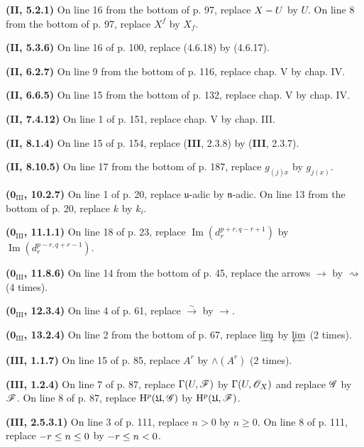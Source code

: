 \noindent\textbf{(\textbf{II}, 5.2.1)} On line 16 from the bottom of p. 97, replace
$X- U$ by $U$. On line 8 from the bottom of p. 97, replace $X^f$ by $X_f$.

\noindent\textbf{(\textbf{II}, 5.3.6)} On line 16 of p. 100, replace (4.6.18) by
(4.6.17).

\noindent\textbf{(\textbf{II}, 6.2.7)} On line 9 from the bottom of p. 116, replace
chap. V by chap. IV.

\noindent\textbf{(\textbf{II}, 6.6.5)} On line 15 from the bottom of p. 132, replace
chap. V by chap. IV.

\noindent\textbf{(\textbf{II}, 7.4.12)} On line 1 of p. 151, replace chap. V by chap.
III.

\noindent\textbf{(\textbf{II}, 8.1.4)} On line 15 of p. 154, replace (\textbf{III}, 2.3.8) by
(\textbf{III}, 2.3.7).

\noindent\textbf{(\textbf{II}, 8.10.5)} On line 17 from the bottom of p. 187, replace
$g_{(j)x}$ by $g_{j(x)}$.

\noindent\textbf{($\mathbf{0}_{\mathrm{III}}$, 10.2.7)} On line 1 of p. 20, replace
$\mathfrak u$-adic by $\mathfrak n$-adic. On line 13 from the bottom of p. 20, replace
$k$ by $k_i$.

\noindent\textbf{($\mathbf{0}_{\mathrm{III}}$, 11.1.1)} On line 18 of p. 23, replace
$\operatorname{Im}(d_r^{p+r,q-r+1})$ by
$\operatorname{Im}(d_r^{p-r,q+r-1})$.

\noindent\textbf{($\mathbf{0}_{\mathrm{III}}$, 11.8.6)} On line 14 from the bottom of
p. 45, replace the arrows $\to$ by $\rightsquigarrow$ (4 times).

\noindent\textbf{($\mathbf{0}_{\mathrm{III}}$, 12.3.4)} On line 4 of p. 61, replace
$\xrightarrow{\sim}$ by $\to$.

\noindent\textbf{($\mathbf{0}_{\mathrm{III}}$, 13.2.4)} On line 2 from the bottom of
p. 67, replace $\varinjlim$ by $\varprojlim$ (2 times).

\noindent\textbf{(\textbf{III}, 1.1.7)} On line 15 of p. 85, replace $A^r$ by
$\wedge(A^r)$ (2 times).

\noindent\textbf{(\textbf{III}, 1.2.4)} On line 7 of p. 87, replace
$\Gamma(U,\mathscr{F})$ by $\Gamma(U,\mathscr{O}_X)$ and replace $\mathscr{G}$ by $\mathscr{F}$.
On line 8 of p. 87, replace $\mathrm{H}^p(\mathfrak U,\mathscr{G})$ by
$\mathrm{H}^p(\mathfrak U,\mathscr{F})$.

\noindent\textbf{(\textbf{III}, 2.5.3.1)} On line 3 of p. 111, replace $n>0$ by
$n\geq0$. On line 8 of p. 111, replace $- r\leq n\leq0$ by $- r\leq n<0$.

